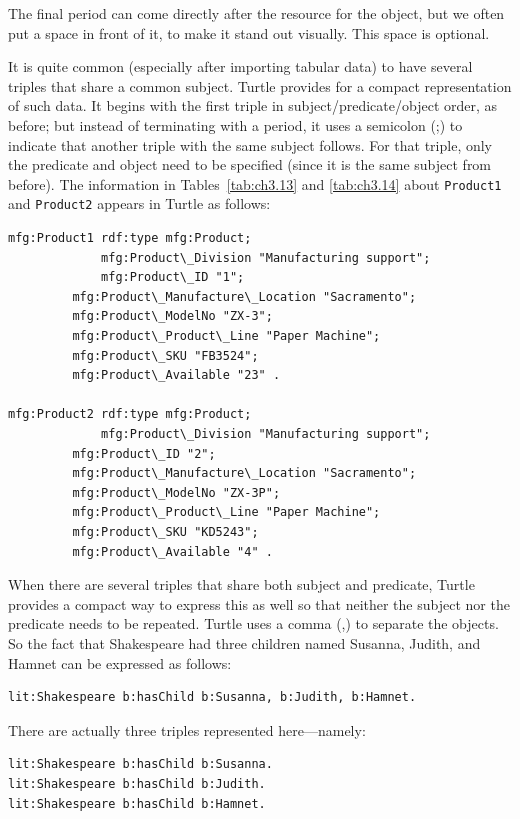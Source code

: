 The final period can come directly after the resource for the object,
but we often put a space in front of it, to make it stand out visually.
This space is optional.

It is quite common (especially after importing tabular data) to have
several triples that share a common subject. Turtle provides for a
compact representation of such data. It begins with the first triple in
subject/predicate/object order, as before; but instead of terminating
with a period, it uses a semicolon (;) to indicate that another triple
with the same subject follows. For that triple, only the predicate and
object need to be specified (since it is the same subject from before).
The information in Tables~\ref{tab:ch3.13} and \ref{tab:ch3.14} about \texttt{Product1} and \texttt{Product2}
appears in Turtle as follows:

\begin{lstlisting}
mfg:Product1 rdf:type mfg:Product;
             mfg:Product\_Division "Manufacturing support"; 
             mfg:Product\_ID "1";
	     mfg:Product\_Manufacture\_Location "Sacramento";
	     mfg:Product\_ModelNo "ZX-3"; 
	     mfg:Product\_Product\_Line "Paper Machine"; 
	     mfg:Product\_SKU "FB3524";
	     mfg:Product\_Available "23" .

mfg:Product2 rdf:type mfg:Product; 
             mfg:Product\_Division "Manufacturing support"; 
	     mfg:Product\_ID "2"; 
	     mfg:Product\_Manufacture\_Location "Sacramento"; 
	     mfg:Product\_ModelNo "ZX-3P"; 
 	     mfg:Product\_Product\_Line "Paper Machine"; 
	     mfg:Product\_SKU "KD5243";
	     mfg:Product\_Available "4" .
\end{lstlisting}

When there are several triples that share both subject and predicate,
Turtle provides a compact way to express this as well so that neither
the subject nor the predicate needs to be repeated. Turtle uses a comma
(,) to separate the objects. So the fact that Shakespeare had three
children named Susanna, Judith, and Hamnet can be expressed as follows:

\begin{lstlisting}
lit:Shakespeare b:hasChild b:Susanna, b:Judith, b:Hamnet.
\end{lstlisting}

There are actually three triples represented here---namely:

\begin{lstlisting}
lit:Shakespeare b:hasChild b:Susanna. 
lit:Shakespeare b:hasChild b:Judith. 
lit:Shakespeare b:hasChild b:Hamnet.
\end{lstlisting}

